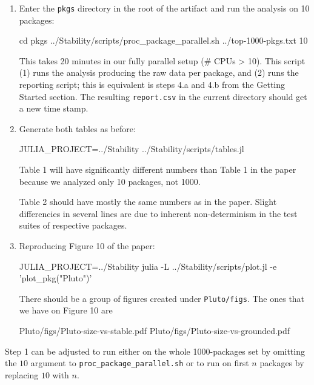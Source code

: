 \documentclass[
]{article}
\begin{document}
\begin{enumerate}
  \def\labelenumii{\alph{enumii}.}
  \item
    Enter the \texttt{pkgs} directory in the root of the artifact and run the analysis
    on 10 packages:

\begin{verbnobox}[\small]
cd pkgs
../Stability/scripts/proc_package_parallel.sh ../top-1000-pkgs.txt 10
\end{verbnobox}

    This takes 20 minutes in our fully parallel setup (\# CPUs \textgreater{}
    10). This script (1) runs the analysis producing the raw data per package, and
    (2) runs the reporting script; this is equivalent is steps 4.a and
    4.b from the Getting Started section. The resulting \texttt{report.csv}
    in the current directory should get a new time stamp.

  \item
    Generate both tables as before:

\begin{verbnobox}[\small]
JULIA_PROJECT=../Stability ../Stability/scripts/tables.jl
\end{verbnobox}

    Table 1 will have significantly different numbers than Table 1 in the paper
    because we analyzed only 10 packages, not 1000.

    Table 2 should have mostly the same numbers as in the paper. Slight
    differencies in several lines are due to inherent non-determinism in the
    test suites of respective packages.

  \item
    Reproducing Figure 10 of the paper:

\begin{verbnobox}[\small]
JULIA_PROJECT=../Stability julia -L ../Stability/scripts/plot.jl -e 'plot_pkg("Pluto")'
\end{verbnobox}

    There should be a group of figures created under
    \texttt{Pluto/figs}. The ones that we have on Figure 10 are

\begin{verbnobox}[\small]
Pluto/figs/Pluto-size-vs-stable.pdf
Pluto/figs/Pluto-size-vs-grounded.pdf
\end{verbnobox}

\end{enumerate}

Step 1 can be adjusted to run either on the whole 1000-packages set by omitting
the $10$ argument to \texttt{proc\_package\_parallel.sh} or to run on first
$n$ packages by replacing $10$ with $n$.
\end{document}
